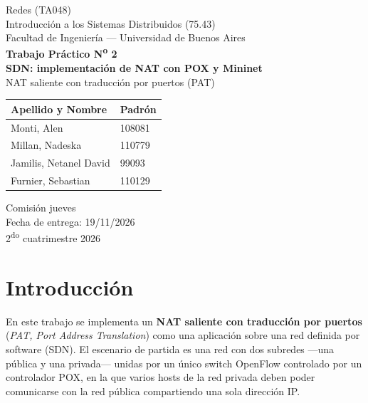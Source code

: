 ﻿\documentclass[10pt,a4paper]{article}
\begin{document}
\begin{titlepage}
\thispagestyle{empty}
\begin{center}
\vspace*{0.5cm}

{\large Redes (TA048)}\\
{\large Introducción a los Sistemas Distribuidos (75.43)}\\[0.2cm]
{\small Facultad de Ingeniería --- Universidad de Buenos Aires}\\[1.2cm]

{\Huge \bfseries Trabajo Práctico N\textsuperscript{o} 2}\\[0.4cm]
{\Large \bfseries SDN: implementación de NAT con POX y Mininet}\\[0.3cm]
{\large NAT saliente con traducción por puertos (PAT)}\\[1.5cm]

\begin{tabular}{ll}
\toprule
\textbf{Apellido y Nombre} & \textbf{Padrón} \\
\midrule
Monti, Alen              & 108081 \\
Millan, Nadeska          & 110779 \\
Jamilis, Netanel David   & 99093  \\
Furnier, Sebastian       & 110129 \\
\bottomrule
\end{tabular}

\vspace{1.5cm}
{\large Comisión jueves}\\[0.3cm]
{\large Fecha de entrega: 19/11/2026}\\[0.3cm]
{\large 2\textsuperscript{do} cuatrimestre 2026}

\vfill
\end{center}
\end{titlepage}

\tableofcontents
\clearpage

\section{Introducción}
En este trabajo se implementa un \textbf{NAT saliente con traducción por puertos}
(\emph{PAT, Port Address Translation}) como una aplicación sobre una red definida
por software (SDN). El escenario de partida es una red con dos subredes ---una
pública y una privada--- unidas por un único switch OpenFlow controlado por un
controlador POX, en la que varios hosts de la red privada deben poder comunicarse
con la red pública compartiendo una sola dirección IP.
\end{document}
